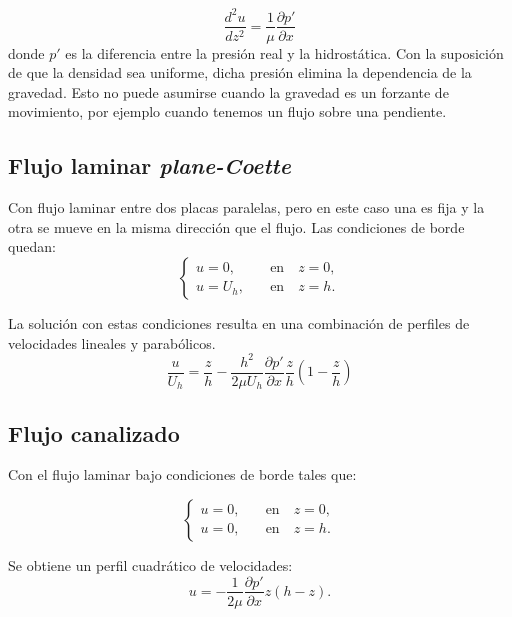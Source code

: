 \documentclass[openany,a4]{book}
\begin{document}
\begin{equation}
    \frac{d^2u}{dz^2}=\frac{1}{\mu}\frac{\partial p'}{\partial x}
\end{equation}
donde $p'$ es la diferencia entre la presión real y la
hidrostática. Con la suposición de que la densidad sea uniforme,
dicha presión elimina la dependencia de la gravedad. Esto no
puede asumirse cuando la gravedad es un forzante de movimiento,
por ejemplo cuando tenemos un flujo sobre una pendiente.

\subsection{Flujo laminar \textit{plane-Coette}}
Con flujo laminar entre dos placas paralelas, pero en este caso
una es fija y la otra se mueve en la misma dirección que el flujo.
Las condiciones de borde quedan:
\begin{equation}
    \begin{cases}
        u=0,&\quad \mathrm{en}\quad z=0,\\
        u=U_h,&\quad \mathrm{en}\quad z=h.
    \end{cases}
\end{equation}

\par La solución con estas condiciones resulta en una combinación
de perfiles de velocidades lineales y parabólicos.
\begin{equation}
    \frac{u}{U_h}=\frac{z}{h}-\frac{h^2}{2\mu U_h}\frac{\partial p'}{\partial x}\frac{z}{h}\left(1-\frac{z}{h}\right)
\end{equation}

\subsection{Flujo canalizado}
Con el flujo laminar bajo condiciones de borde tales que:

\begin{equation}
    \begin{cases}
        u=0,&\quad \mathrm{en}\quad z=0,\\
        u=0,&\quad \mathrm{en}\quad z=h.
    \end{cases}
\end{equation}

Se obtiene un perfil cuadrático de velocidades:
\begin{equation}
    u=-\frac1{2\mu}\frac{\partial p'}{\partial x}z(h-z).
\end{equation}
\end{document}
